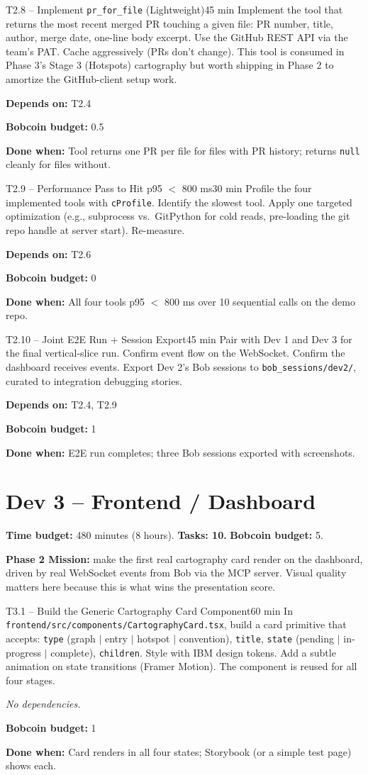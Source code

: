 \documentclass[11pt,letterpaper]{article}
\newcommand{\acceptance}[1]{\par\smallskip\textcolor{ibmgreen}{\textbf{Done when:}} #1}
\newcommand{\depends}[1]{\par\smallskip\textcolor{ibmorange}{\textbf{Depends on:}} #1}
\newcommand{\nodep}{\par\smallskip\textcolor{ibmgray}{\textit{No dependencies.}}}
\newcommand{\bobcost}[1]{\par\smallskip\textcolor{ibmaccent}{\textbf{Bobcoin budget:}} #1}
\begin{document}
\begin{task}{T2.8 -- Implement \texttt{pr\_for\_file} (Lightweight)}{45 min}
Implement the tool that returns the most recent merged PR touching a given file: PR number, title, author, merge date, one-line body excerpt. Use the GitHub REST API via the team's PAT. Cache aggressively (PRs don't change). This tool is consumed in Phase 3's Stage 3 (Hotspots) cartography but worth shipping in Phase 2 to amortize the GitHub-client setup work.
\depends{T2.4}
\bobcost{0.5}
\acceptance{Tool returns one PR per file for files with PR history; returns \texttt{null} cleanly for files without.}
\end{task}

\begin{task}{T2.9 -- Performance Pass to Hit p95 $<$ 800 ms}{30 min}
Profile the four implemented tools with \texttt{cProfile}. Identify the slowest tool. Apply one targeted optimization (e.g., subprocess vs.~GitPython for cold reads, pre-loading the git repo handle at server start). Re-measure.
\depends{T2.6}
\bobcost{0}
\acceptance{All four tools p95 $<$ 800 ms over 10 sequential calls on the demo repo.}
\end{task}

\begin{task}{T2.10 -- Joint E2E Run + Session Export}{45 min}
Pair with Dev 1 and Dev 3 for the final vertical-slice run. Confirm event flow on the WebSocket. Confirm the dashboard receives events. Export Dev 2's Bob sessions to \texttt{bob\_sessions/dev2/}, curated to integration debugging stories.
\depends{T2.4, T2.9}
\bobcost{1}
\acceptance{E2E run completes; three Bob sessions exported with screenshots.}
\end{task}

\section{Dev 3 -- Frontend / Dashboard}

\textbf{Time budget:} 480 minutes (8 hours). \textbf{Tasks: 10.} \textbf{Bobcoin budget:} 5.

\textbf{Phase 2 Mission:} make the first real cartography card render on the dashboard, driven by real WebSocket events from Bob via the MCP server. Visual quality matters here because this is what wins the presentation score.

\begin{task}{T3.1 -- Build the Generic Cartography Card Component}{60 min}
In \texttt{frontend/src/components/CartographyCard.tsx}, build a card primitive that accepts: \texttt{type} (graph $|$ entry $|$ hotspot $|$ convention), \texttt{title}, \texttt{state} (pending $|$ in-progress $|$ complete), \texttt{children}. Style with IBM design tokens. Add a subtle animation on state transitions (Framer Motion). The component is reused for all four stages.
\nodep
\bobcost{1}
\acceptance{Card renders in all four states; Storybook (or a simple test page) shows each.}
\end{task}
\end{document}
